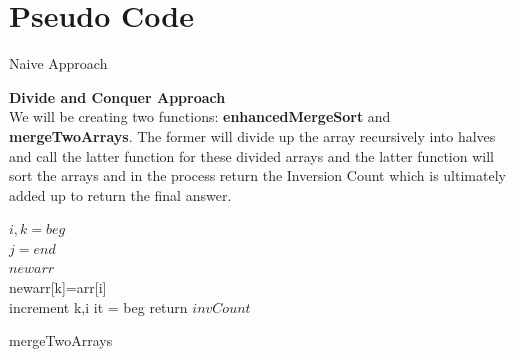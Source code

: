 \documentclass[conference]{IEEEtran}
\begin{document}
\section{\textbf{Pseudo Code}}
\begin{algorithm}
\caption{Naive Approach}
\end{algorithm}
\noindent \textbf{Divide and Conquer Approach}\\
\noindent We will be creating two functions: \textbf{enhancedMergeSort} and \textbf{mergeTwoArrays}. The former will divide up the array recursively into halves and call the latter function for these divided arrays and the latter function will sort the arrays and in the process return the Inversion Count which is ultimately added up to return the final answer.


\begin{algorithm}
\DontPrintSemicolon

  $i,k=beg$\\
  $j=end$\\
  $newarr$\\
  {
    {
        newarr[k]=arr[i]\\
        increment k,i
    }
  }
  it = beg
  return $invCount$
\caption{mergeTwoArrays}
\end{algorithm}
\end{document}
